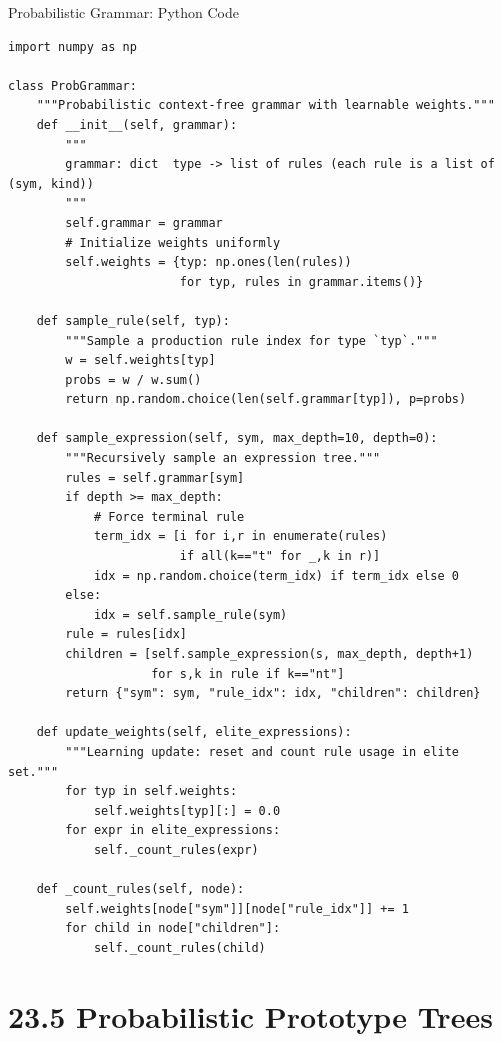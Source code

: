 \documentclass[aspectratio=169,10pt]{beamer}
\begin{document}
\begin{frame}[fragile]{Probabilistic Grammar: Python Code}
\begin{lstlisting}[style=python]
import numpy as np

class ProbGrammar:
    """Probabilistic context-free grammar with learnable weights."""
    def __init__(self, grammar):
        """
        grammar: dict  type -> list of rules (each rule is a list of (sym, kind))
        """
        self.grammar = grammar
        # Initialize weights uniformly
        self.weights = {typ: np.ones(len(rules))
                        for typ, rules in grammar.items()}

    def sample_rule(self, typ):
        """Sample a production rule index for type `typ`."""
        w = self.weights[typ]
        probs = w / w.sum()
        return np.random.choice(len(self.grammar[typ]), p=probs)

    def sample_expression(self, sym, max_depth=10, depth=0):
        """Recursively sample an expression tree."""
        rules = self.grammar[sym]
        if depth >= max_depth:
            # Force terminal rule
            term_idx = [i for i,r in enumerate(rules)
                        if all(k=="t" for _,k in r)]
            idx = np.random.choice(term_idx) if term_idx else 0
        else:
            idx = self.sample_rule(sym)
        rule = rules[idx]
        children = [self.sample_expression(s, max_depth, depth+1)
                    for s,k in rule if k=="nt"]
        return {"sym": sym, "rule_idx": idx, "children": children}

    def update_weights(self, elite_expressions):
        """Learning update: reset and count rule usage in elite set."""
        for typ in self.weights:
            self.weights[typ][:] = 0.0
        for expr in elite_expressions:
            self._count_rules(expr)

    def _count_rules(self, node):
        self.weights[node["sym"]][node["rule_idx"]] += 1
        for child in node["children"]:
            self._count_rules(child)
\end{lstlisting}
\end{frame}

\section{23.5 Probabilistic Prototype Trees}
\end{document}
